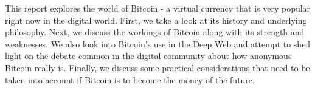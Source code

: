 This report explores the world of Bitcoin - a virtual currency that is very popular right now in the digital world.
First, we take a look at its history and underlying philosophy.
Next, we discuss the workings of Bitcoin along with its strength and weaknesses.
We also look into Bitcoin's use in the Deep Web and attempt to shed light on the debate common in the digital community about how anonymous Bitcoin really is.
Finally, we discuss some practical considerations that need to be taken into account if Bitcoin is to become the money of the future. 
